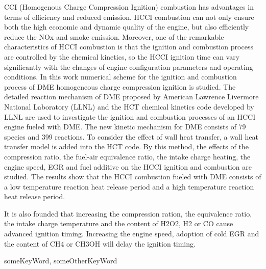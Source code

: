 \setlength{\parindent}{2em}

\begin{abstractEn}
	\noindent CCI (Homogenous Charge Compression Ignition) combustion has advantages in terms of efficiency and reduced emission. HCCI combustion can not only ensure both the high economic and dynamic quality of the engine, but also efficiently reduce the NOx and smoke emission. Moreover, one of the remarkable characteristics of HCCI combustion is that the ignition and combustion process are controlled by the chemical kinetics, so the HCCI ignition time can vary significantly with the changes of engine configuration parameters and operating conditions. In this work numerical scheme for the ignition and combustion process of DME homogeneous charge compression ignition is studied. The detailed reaction mechanism of DME proposed by American Lawrence Livermore National Laboratory (LLNL) and the HCT chemical kinetics code developed by LLNL are used to investigate the ignition and combustion processes of an HCCI engine fueled with DME. The new kinetic mechanism for DME consists of 79 species and 399 reactions. To consider the effect of wall heat transfer, a wall heat transfer model is added into the HCT code. By this method, the effects of the compression ratio, the fuel-air equivalence ratio, the intake charge heating, the engine speed, EGR and fuel additive on the HCCI ignition and combustion are studied. The results show that the HCCI combustion fueled with DME consists of a low temperature reaction heat release period and a high temperature reaction heat release period. 
	
	It is also founded that increasing the compression ration, the equivalence ratio, the intake charge temperature and the content of H2O2, H2 or CO cause advanced ignition timing. Increasing the engine speed, adoption of cold EGR and the content of CH4 or CH3OH will delay the ignition timing.
\end{abstractEn}

\setlength{\parindent}{0em}

\begin{keywordsEn}
	someKeyWord, someOtherKeyWord
\end{keywordsEn}
